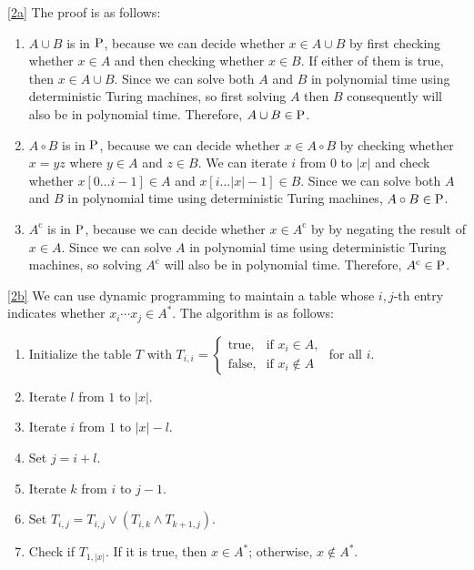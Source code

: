 \documentclass{homework}
\begin{document}
\begin{solution}

  \ref{2a} The proof is as follows:
  \begin{enumerate}
    \item $A \cup B$ is in $\P$, because we can decide whether $x \in A \cup B$
      by first checking whether $x \in A$ and then checking whether $x \in B$.
      If either of them is true, then $x \in A \cup B$.
      Since we can solve both $A$ and $B$ in polynomial time using deterministic
      Turing machines, so first solving $A$ then $B$ consequently will also be
      in polynomial time. Therefore, $A \cup B \in \P$.
    \item $A \circ B$ is in $\P$, because we can decide whether $x \in A \circ B$ by
      checking whether $x = yz$ where $y \in A$ and $z \in B$.
      We can iterate $i$ from $0$ to $|x|$ and check whether $x[0 \ldots i-1] \in A$
      and $x[i \ldots |x| - 1] \in B$.
      Since we can solve both $A$ and $B$ in polynomial time using deterministic Turing machines,
      $A \circ B \in \P$.
    \item $A^{\text{c}}$ is in $\P$, because we can decide whether $x \in A^{\text{c}}$ by
      by negating the result of $x \in A$. Since we can solve $A$ in polynomial time
      using deterministic Turing machines, so solving $A^{\text{c}}$ will also be in
      polynomial time. Therefore, $A^{\text{c}} \in \P$.
  \end{enumerate}

  \ref{2b}
  We can use dynamic programming to maintain a table whose $i,j$-th entry indicates
  whether $x_{i} \cdots x_{j} \in A^{*}$.
  The algorithm is as follows:
  \begin{enumerate}
    \item Initialize the table $T$ with $T_{i, i} = \begin{cases}
      \text{true}, &\text{if } x_i \in A, \\
      \text{false}, &\text{if } x_i \notin A \end{cases}$ for all $i$.
    \item Iterate $l$ from $1$ to $|x|$.
    \item Iterate $i$ from $1$ to $|x| - l$.
    \item Set $j = i + l$.
    \item Iterate $k$ from $i$ to $j - 1$.
    \item Set $T_{i, j} = T_{i, j} \vee (T_{i, k} \wedge T_{k+1, j})$.
    \item Check if $T_{1, |x|}$.
          If it is true, then $x \in A^{*}$;
          otherwise, $x \notin A^{*}$.
  \end{enumerate}


\end{solution}
\end{document}

